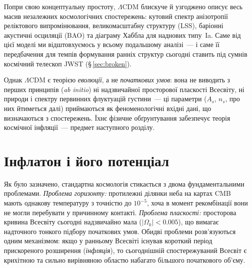 \documentclass[12pt, a4paper]{article}
\begin{document}
Попри свою концептуальну простоту, $\Lambda$CDM блискуче й узгоджено
описує весь масив незалежних космологічних спостережень: кутовий спектр
анізотропії реліктового випромінювання, великомасштабну структуру (LSS),
баріонні акустичні осциляції (BAO) та діаграму Хаббла для наднових типу~Ia.
Саме від цієї моделі ми відштовхуємось у всьому подальшому аналізі~--- і
саме її передбачення для темпів формування ранніх структур сьогодні
ставить під сумнів космічний телескоп JWST (§\,\ref{sec:broken}).

Однак $\Lambda$CDM є теорією \emph{еволюції}, а не
\emph{початкових умов}: вона не виводить з перших принципів (\emph{ab initio})
ні надзвичайної просторової пласкості Всесвіту, ні природи
і спектру первинних флуктуацій густини~--- ці параметри
($A_s$, $n_s$, про них йтиметься далі) приймаються як феноменологічні вхідні дані,
що визначаються з спостережень. Їхнє фізичне обґрунтування
забезпечує теорія космічної інфляції~--- предмет наступного розділу.

%


\section{Інфлатон і його потенціал}
\label{sec:inflaton}

Як було зазначено, стандартна космологія стикається
з двома фундаментальними проблемами. \emph{Проблема горизонту:}
протилежні ділянки неба на картах CMB мають однакову температуру
з точністю до $10^{-5}$, хоча в момент рекомбінації вони не могли
перебувати у причинному контакті. \emph{Проблема пласкості:}
просторова кривина Всесвіту сьогодні надзвичайно мала
($|\Omega_k| < 0.005$), що вимагає надточного тонкого підбору
початкових умов. Обидві проблеми розв'язуються одним механізмом:
якщо у ранньому Всесвіті існував короткий період прискореного
розширення (\emph{інфляція}), то сьогоднішній спостережуваний
Всесвіт є крихітною та сильно вирівняною областю набагато більшого
початкового об'єму.
\end{document}
